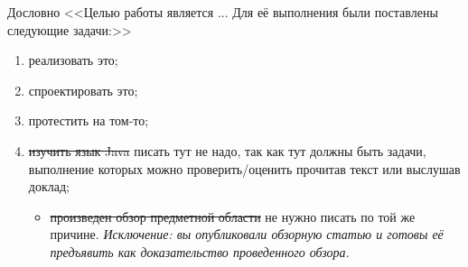 
\label{sec:task}
 Дословно <<Целью работы является ... Для её выполнения были поставлены следующие задачи:>>
 \begin{enumerate}
 \item  реализовать это;
 \item  спроектировать это;
 \item  протестить на том-то;
 \item \sout{изучить язык Java} писать тут не надо, так как тут должны быть задачи, выполнение которых можно проверить/оценить прочитав текст или выслушав доклад;
   \begin{itemize}
   \item \sout{произведен обзор предметной области} не нужно писать по той же причине. \emph{Исключение: вы опубликовали обзорную статью и готовы её предъявить как доказательство проведенного обзора.}
   \end{itemize}
 \end{enumerate}
